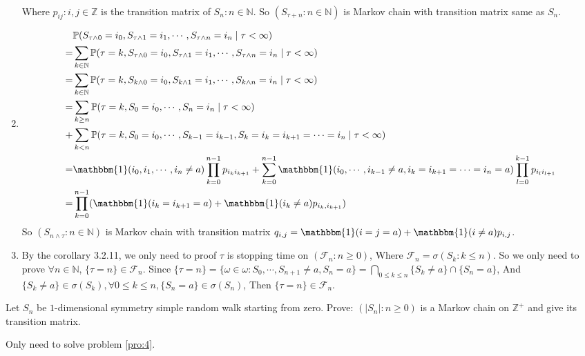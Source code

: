 \documentclass[../main]{subfiles}
\begin{document}
\begin{solution}
\begin{enumerate}
\[\begin{aligned}
        \end{aligned}
      \]
      Where \(p_{ij}:i,j \in \mathbb{Z}\) is the transition matrix of \(S_n:n \in \mathbb{N}\).
      So \((S_{\tau+n}:n \in \mathbb{N})\) is Markov chain with transition matrix same as \(S_n\).
    \item       \[
        \begin{aligned}
           & \mathbb{P}(S_{\tau \wedge 0}=i_0,S_{\tau\wedge 1}=i_1,\cdots,S_{\tau\wedge n}=i_n \mid \tau<\infty)
          \\= & \sum_{k \in \mathbb{N}}\mathbb{P}(\tau=k,S_{\tau \wedge 0}=i_0,S_{\tau\wedge 1}=i_1,\cdots,S_{\tau\wedge n}=i_n \mid \tau<\infty)
          \\= & \sum_{k \in \mathbb{N}}\mathbb{P}(\tau=k,S_{k \wedge 0}=i_0,S_{k\wedge 1}=i_1,\cdots,S_{k\wedge n}=i_n \mid \tau<\infty)
          \\= & \sum_{k \geq n} \mathbb{P}(\tau =k,S_0=i_0,\cdots,S_n=i_n \mid \tau<\infty)
          \\+ & \sum_{k < n} \mathbb{P}(\tau =k,S_0=i_0,\cdots,S_{k-1}=i_{k-1},S_k=i_k=i_{k+1} =\cdots=i_n \mid \tau<\infty)
          \\= & \mathbbm{1}(i_0,i_1,\cdots,i_n \neq a) \prod_{k=0}^{n-1} p_{i_k i_{k+1}} + \sum_{k=0}^{n-1} \mathbbm{1}(i_0,\cdots,i_{k-1} \neq a,i_k=i_{k+1}=\cdots=i_n=a) \prod_{l=0}^{k-1} p_{i_l i_{l+1}}
          \\=&\prod_{k=0}^{n-1} (\mathbbm{1}(i_k=i_{k+1}=a)+\mathbbm{1}(i_k \neq a)p_{i_k,i_{k+1}})
        \end{aligned}
      \]
      So \((S_{n \wedge \tau}:n \in \mathbb{N})\) is Markov chain with transition matrix \(q_{i,j}=\mathbbm{1}(i=j=a)+\mathbbm{1}(i \neq a)p_{i,j}\).
    \item By the corollary 3.2.11, we only need to proof \(\tau\) is stopping time on \((\mathscr{\mathcal{F}}_n:n \geq 0)\),
      Where \(\mathscr{\mathcal{F}}_n=\sigma(S_k:k \leq n)\).
      So we only need to prove \(\forall n \in \mathbb{N}\), \(\{\tau = n\} \in \mathscr{\mathcal{F}}_n\).
      Since \(\{\tau =n\}=\{\omega \in \omega: S_0,\cdots,S_{n + 1} \neq a, S_n = a\}=\bigcap_{0 \leq k \leq n}\{S_k \neq a\}\cap\{S_n=a\}\),
      And \(\{S_k \neq a\} \in \sigma(S_k), \forall 0 \leq k \leq n,\{S_n = a\} \in \sigma(S_n)\),
      Then \(\{\tau = n\} \in \mathscr{\mathcal{F}}_n\).
  \end{enumerate}
\end{solution}

\begin{problem}\label{pro:3}
  Let \(S_n\) be \(1\)-dimensional symmetry simple random walk starting from zero.
  Prove: \((|S_n|: n \geq 0)\) is a Markov chain on \(\mathbb{Z}^+\) and give its transition matrix.
\end{problem}
\begin{solution}
  Only need to solve problem \ref{pro:4}.
\end{solution}
\end{document}
